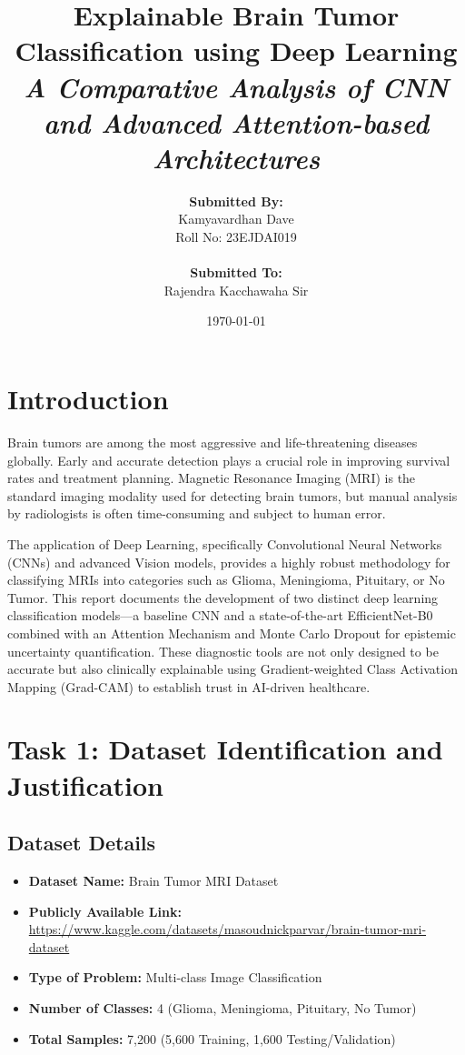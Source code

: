 \documentclass[12pt, a4paper]{article}
\title{
    \vspace{2cm}
    \textbf{\Huge Explainable Brain Tumor Classification using Deep Learning}\\
    \vspace{1cm}
    \large \textit{A Comparative Analysis of CNN and Advanced Attention-based Architectures}
    \vspace{2cm}
}
\author{
    \textbf{Submitted By:}\\
    Kamyavardhan Dave\\
    Roll No: 23EJDAI019\\
    \vspace{1cm}\\
    \textbf{Submitted To:}\\
    Rajendra Kacchawaha Sir
}
\date{\today}
\begin{document}
\maketitle
\newpage

\tableofcontents
\newpage

\section*{Introduction}
Brain tumors are among the most aggressive and life-threatening diseases globally. Early and accurate detection plays a crucial role in improving survival rates and treatment planning. Magnetic Resonance Imaging (MRI) is the standard imaging modality used for detecting brain tumors, but manual analysis by radiologists is often time-consuming and subject to human error.

The application of Deep Learning, specifically Convolutional Neural Networks (CNNs) and advanced Vision models, provides a highly robust methodology for classifying MRIs into categories such as Glioma, Meningioma, Pituitary, or No Tumor. This report documents the development of two distinct deep learning classification models—a baseline CNN and a state-of-the-art EfficientNet-B0 combined with an Attention Mechanism and Monte Carlo Dropout for epistemic uncertainty quantification. These diagnostic tools are not only designed to be accurate but also clinically explainable using Gradient-weighted Class Activation Mapping (Grad-CAM) to establish trust in AI-driven healthcare.

\vspace{0.5cm}

\section*{Task 1: Dataset Identification and Justification}

\subsection*{Dataset Details}
\begin{itemize}
    \item \textbf{Dataset Name:} Brain Tumor MRI Dataset
    \item \textbf{Publicly Available Link:} \url{https://www.kaggle.com/datasets/masoudnickparvar/brain-tumor-mri-dataset} %
    \item \textbf{Type of Problem:} Multi-class Image Classification
    \item \textbf{Number of Classes:} 4 (Glioma, Meningioma, Pituitary, No Tumor)
    \item \textbf{Total Samples:} 7,200 (5,600 Training, 1,600 Testing/Validation)
\end{itemize}
\end{document}
